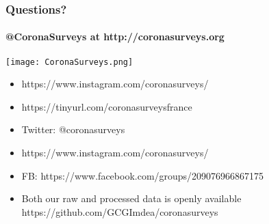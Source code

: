 \documentclass{beamer}
\begin{document}








\begin{frame}
  \frametitle{Questions?}
  \framesubtitle{@CoronaSurveys at http://coronasurveys.org}
  \begin{center}
  \texttt{[image: CoronaSurveys.png]}
  \end{center}
  \begin{itemize}
    \item
  https://www.instagram.com/coronasurveys/
  \item
  https://tinyurl.com/coronasurveysfrance
\item
  Twitter: @coronasurveys
\item
  https://www.instagram.com/coronasurveys/ 
\item
  FB: https://www.facebook.com/groups/209076966867175

  \vspace{1ex}
\item
  Both our raw and processed data is openly available
  https://github.com/GCGImdea/coronasurveys
\end{itemize}
\end{frame}
\end{document}

